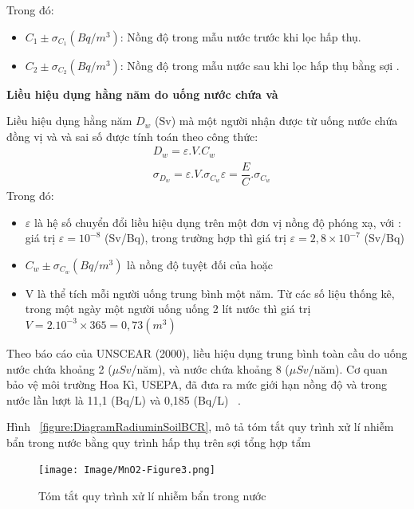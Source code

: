         Trong đó: 
        \begin{itemize}
            \item $C_1 \pm \sigma_{C_1}(Bq/m^3)$: Nồng độ  trong mẫu nước trước khi lọc hấp thụ.  
            \item $C_2  \pm \sigma_{C_2} (Bq/m^3)$: Nồng độ  trong mẫu nước sau khi lọc hấp thụ bằng sợi .
        \end{itemize}
 


    \textbf{ Liều hiệu dụng hằng năm do uống nước chứa   và }

      Liều hiệu dụng hằng năm $D_w$ (Sv) mà một người nhận được từ uống nước chứa đồng vị  và  và sai số được tính toán theo công thức:  
      \begin{align}
          &D_w = \varepsilon. V. C_w\\
          &\sigma_{D_w} = \varepsilon.V.\sigma_{C_w} \varepsilon = \dfrac{E}{C}.\sigma_{C_w}
      \end{align}
      Trong đó: 
      \begin{itemize}
          \item $\varepsilon$ là hệ số chuyển đổi liều hiệu dụng trên một đơn vị nồng độ phóng xạ, với : giá trị $\varepsilon= 10^{-8}$ (Sv/Bq), trong trường hợp  thì giá trị $\varepsilon  = 2,8 \times 10^{-7} $ (Sv/Bq)
          \item $C_w \pm \sigma_{C_w}  (Bq/m^3)  $ là nồng độ tuyệt đối của    hoặc 
          \item V là thể tích mỗi người uống trung bình một năm. Từ các số liệu thống kê, trong một ngày một người uống  uống 2 lít nước thì giá trị $V  = 2.10^{-3} \times 365 = 0,73 (m^3) $ 
      \end{itemize}
     Theo báo cáo của UNSCEAR (2000), liều hiệu dụng trung bình toàn cầu do uống nước chứa  khoảng 2 ($\mu Sv$/năm), và nước  chứa  khoảng 8  ($\mu Sv$/năm).  Cơ quan bảo vệ môi trường Hoa Kì, USEPA, đã đưa ra mức giới hạn nồng độ   và  trong nước lần lượt là 11,1 (Bq/L) và 0,185 (Bq/L) ~\cite{Thesis:HNPThu}. 
     
     
      
     Hình ~\ref{figure:DiagramRadiuminSoilBCR}, mô tả tóm tắt quy trình xử lí nhiễm bẩn  trong nước bằng quy trình hấp thụ  trên sợi tổng hợp tẩm 

     \begin{figure}[htbp]
         \centering
         \texttt{[image: Image/MnO2-Figure3.png]}
         \caption{Tóm tắt quy trình xử lí nhiễm bẩn  trong nước}
         \label{figure:MnO2SoDoTomTat}
     \end{figure}
 
       
 

        
        
        
        